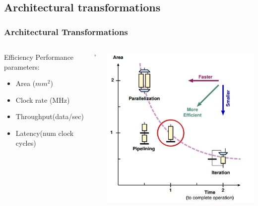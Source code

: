 \documentclass[compress]{beamer}
\begin{document}
\subsection[trans]{Architectural transformations}
\begin{frame}
	\frametitle{Architectural Transformations}
	\begin{columns}
		
		\begin{block}{Efficiency}
			Performance parameters:
			\begin{itemize}
				\item Area ($mm^{2}$)	
				\item Clock rate (MHz)
				\item Throughput(data/sec)
				\item Latency(num clock cycles)
			\end{itemize}
		\end{block}'
		\begin{center}
			\includegraphics[width=0.9 \textwidth]{to_comp}
		\end{center}	
	\end{columns}
\end{frame}
\end{document}
